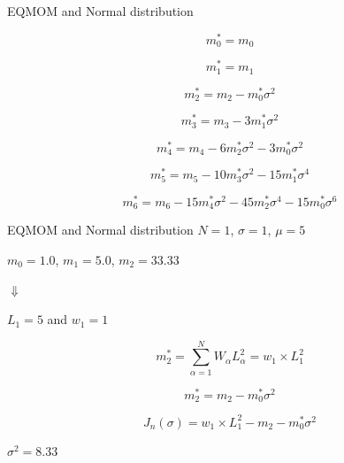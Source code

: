 \documentclass{beamer}
\begin{document}
\begin{frame}{EQMOM and Normal distribution}

\begin{equation*}
m_0^*=m_0
\end{equation*}

\begin{equation*}
m_1^*=m_1
\end{equation*}

\begin{equation*}
m_2^*=m_2-m_0^*\sigma^2
\end{equation*}

\begin{equation*}
m_3^*=m_3-3m_1^*\sigma^2
\end{equation*} 

\begin{equation*}
m_4^*=m_4-6m_2^*\sigma^2-3m_0^*\sigma^2
\end{equation*} 

\begin{equation*}
m_5^*=m_5-10m_3^*\sigma^2-15m_1^*\sigma^4
\end{equation*} 

\begin{equation*}
m_6^*=m_6-15m_4^*\sigma^2-45m_2^*\sigma^4-15m_0^*\sigma^6
\end{equation*} 


\end{frame}

\begin{frame}{EQMOM and Normal distribution $N=1$, $\sigma=1$, $\mu=5$}

\begin{center}
$m_0=1.0$, $m_1=5.0$, $m_2=33.33$
\end{center}

\begin{center}
$\Downarrow$
\end{center}

\begin{center}
$L_1=5$ and $w_1=1$
\end{center}

\begin{equation*}
m_2^*=\sum_{\alpha=1}^{N}W_{\alpha} L_\alpha^2=w_1 \times L_1^2
\end{equation*} 

\begin{equation*}
m_2^*=m_2-m_0^*\sigma^2
\end{equation*}

\begin{equation*}
J_n(\sigma)=w_1 \times L_1^2-m_2-m_0^*\sigma^2
\end{equation*}

\begin{center}
$\boxed{\sigma^2=8.33}$
\end{center}

\end{frame}
\end{document}
